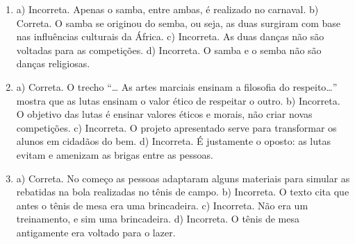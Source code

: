 \begin{enumerate}

\item
a) Incorreta. Apenas o samba, entre ambas, é realizado no carnaval.
b) Correta. O samba se originou do semba, ou seja, as duas
surgiram com base nas influências culturais da África.
c) Incorreta. As duas danças não são voltadas para as
competições.
d) Incorreta. O samba e o semba não são danças religiosas.

\item
a) Correta. O trecho “\ldots{} As artes marciais ensinam a filosofia
do respeito\ldots{}” mostra que as lutas ensinam o valor ético de respeitar
o outro.
b) Incorreta. O objetivo das lutas é ensinar valores éticos e
morais, não criar novas competições.
c) Incorreta. O projeto apresentado serve para transformar os alunos
em cidadãos do bem.
d) Incorreta. É justamente o oposto: as lutas
evitam e amenizam as brigas entre as pessoas.

\item
a) Correta. No começo as pessoas adaptaram alguns materiais para
simular as rebatidas na bola realizadas no tênis de campo.
b) Incorreta. O texto cita que antes o tênis de mesa era uma
brincadeira.
c) Incorreta. Não era um treinamento, e sim uma brincadeira.
d) Incorreta. O tênis de mesa antigamente era voltado para o
lazer.
\end{enumerate}
